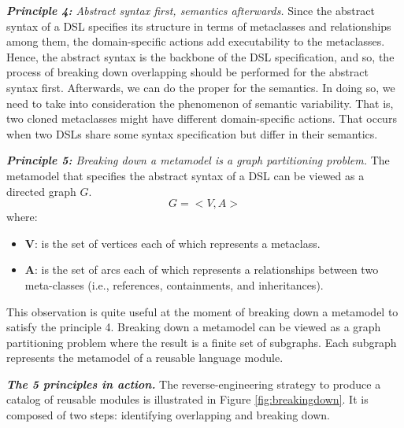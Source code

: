 \vspace{2mm}
\textit{\textbf{Principle 4:} Abstract syntax first, semantics afterwards.} Since the abstract syntax of a DSL specifies its structure in terms of metaclasses and relationships among them, the domain-specific actions add executability to the metaclasses. Hence, the abstract syntax is the backbone of the DSL specification, and so, the process of breaking down overlapping should be performed for the abstract syntax first. Afterwards, we can do the proper for the semantics. In doing so, we need to take into consideration the phenomenon of semantic variability. That is, two cloned metaclasses might have different domain-specific actions. That occurs when two DSLs share some syntax specification but differ in their semantics.

\vspace{2mm}
\textit{\textbf{Principle 5:} Breaking down a metamodel is a graph partitioning problem.} The metamodel that specifies the abstract syntax of a DSL can be viewed as a directed graph $G$. $$G=<V,A>$$ where:

\begin{itemize}
\item \textbf{V}: is the set of vertices each of which represents a metaclass.
\item \textbf{A}: is the set of arcs each of which represents a relationships between two meta-classes (i.e., references, containments, and inheritances).
\end{itemize}

This observation is quite useful at the moment of breaking down a metamodel to satisfy the principle 4. Breaking down a metamodel can be viewed as a graph partitioning problem where the result is a finite set of subgraphs. Each subgraph represents the metamodel of a reusable language module.

\vspace{2mm}
\textbf{\textit{The 5 principles in action.}} The reverse-engineering strategy to produce a catalog of reusable modules is illustrated in Figure \ref{fig:breakingdown}. It is composed of two steps: identifying overlapping and breaking down.

